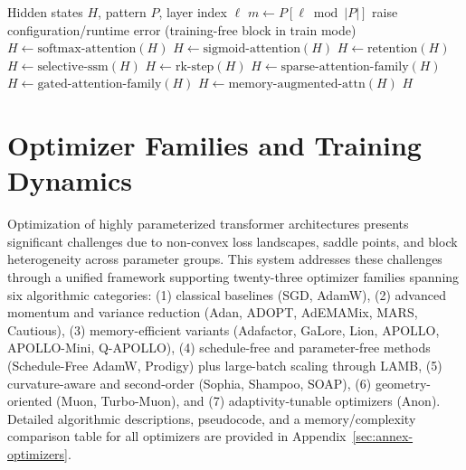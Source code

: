 \documentclass[11pt,a4paper]{article}
\begin{document}
\begin{algorithm}[t]
\caption{Pattern-Driven Mixer Forward (Conceptual)}
\begin{algorithmic}[1]
\Require Hidden states $H$, pattern $P$, layer index $\ell$
\State $m \gets P[\ell \bmod |P|]$
    \State raise configuration/runtime error (training-free block in train mode)
    \State $H \gets \text{softmax-attention}(H)$
    \State $H \gets \text{sigmoid-attention}(H)$
    \State $H \gets \text{retention}(H)$
    \State $H \gets \text{selective-ssm}(H)$
    \State $H \gets \text{rk-step}(H)$
    \State $H \gets \text{sparse-attention-family}(H)$
    \State $H \gets \text{gated-attention-family}(H)$
\Else
    \State $H \gets \text{memory-augmented-attn}(H)$
\EndIf
\State \Return $H$
\end{algorithmic}
\end{algorithm}

\section{Optimizer Families and Training Dynamics}
\label{sec:optimizer-families}

Optimization of highly parameterized transformer architectures presents significant challenges due to non-convex loss landscapes, saddle points, and block heterogeneity across parameter groups. This system addresses these challenges through a unified framework supporting twenty-three optimizer families spanning six algorithmic categories: (1) classical baselines (SGD, AdamW), (2) advanced momentum and variance reduction (Adan, ADOPT, AdEMAMix, MARS, Cautious), (3) memory-efficient variants (Adafactor, GaLore, Lion, APOLLO, APOLLO-Mini, Q-APOLLO), (4) schedule-free and parameter-free methods (Schedule-Free AdamW, Prodigy) plus large-batch scaling through LAMB, (5) curvature-aware and second-order (Sophia, Shampoo, SOAP), (6) geometry-oriented (Muon, Turbo-Muon), and (7) adaptivity-tunable optimizers (Anon). Detailed algorithmic descriptions, pseudocode, and a memory/complexity comparison table for all optimizers are provided in Appendix~\ref{sec:annex-optimizers}.
\end{document}
